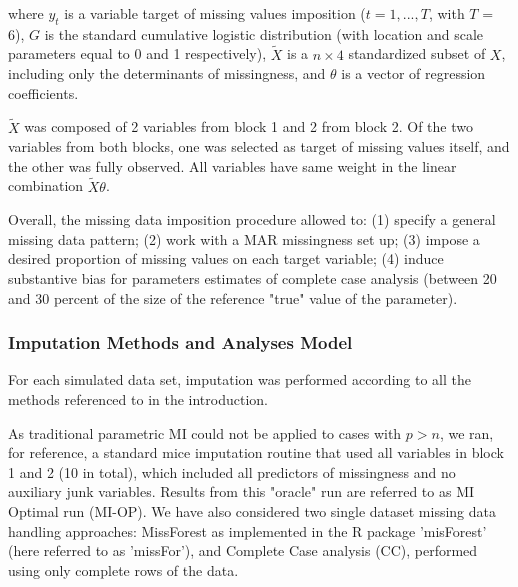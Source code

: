 where $y_t$ is a variable target of missing values imposition ($t = 1,...,T$, with $T$ = 6), $G$ is the standard cumulative logistic distribution 
(with location and scale parameters equal to 0 and 1 respectively), $\tilde{X}$ is a $n \times 4$ standardized subset of $X$, 
including only the determinants of missingness, and $\theta$ is a vector of regression coefficients. 

$\tilde{X}$ was composed of 2 variables from block 1 and 2 from block 2. Of the two variables from both blocks,
one was selected as target of missing values itself, and the other was fully observed. All variables have same weight
in the linear combination $\tilde{X}\theta$.

\iffalse %
The value of the linear predictor was also "off-setted" to induce missingness in the lower tail of the distribution
of linear predictor $\tilde{X}\theta$. This procedure does not imply that missingness in the target variable depends 
on the target variable itself, as the offset is applied based on the values of $\tilde{X}$.
\fi

Overall, the missing data imposition procedure allowed to: 
(1) specify a general missing data pattern; 
(2) work with a MAR missingness set up;
(3) impose a desired proportion of missing values on each target variable; 
(4) induce substantive bias for parameters estimates of complete case analysis (between 20 and 30 percent of 
the size of the reference "true" value of the parameter).

\subsubsection{Imputation Methods and Analyses Model}

For each simulated data set, imputation was performed according to all the methods referenced to in the introduction.

As traditional parametric MI could not be applied to cases with $p > n$, we ran, for reference, a standard mice imputation 
routine that used all variables in block 1 and 2 (10 in total), which included all predictors of missingness and no 
auxiliary junk variables. Results from this "oracle" run are referred to as MI Optimal run (MI-OP). 
We have also considered two single dataset missing data handling approaches: MissForest \citep{stekhovenBuhlmann:2011} as 
implemented in the R package 'misForest' (here referred to as 'missFor'), and Complete Case analysis (CC), performed 
using only complete rows of the data.

